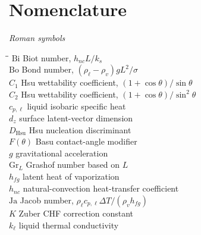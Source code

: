 \section*{Nomenclature}

\noindent\textit{Roman symbols}
\begin{tabbing}
\hspace{2.4cm}\=\hspace{10cm}\=\kill
$\mathrm{Bi}$      \> Biot number, $h_{nc}L/k_s$                          \> [---] \\
$\mathrm{Bo}$      \> Bond number, $(\rho_{\ell}-\rho_v)gL^2/\sigma$        \> [---] \\
$C_1$              \> Hsu wettability coefficient, $(1+\cos\theta)/\sin\theta$  \> [---] \\
$C_2$              \> Hsu wettability coefficient, $(1+\cos\theta)/\sin^{2}\theta$ \> [---] \\
$c_{p,\ell}$       \> liquid isobaric specific heat                       \> [\si{J/(kg.K)}] \\
$d_z$              \> surface latent-vector dimension                     \> [---] \\
$D_{\mathrm{Hsu}}$ \> Hsu nucleation discriminant                         \> [---] \\
$F(\theta)$        \> Basu contact-angle modifier                         \> [---] \\
$g$                \> gravitational acceleration                          \> [\si{m/s^2}] \\
$\mathrm{Gr}_L$    \> Grashof number based on $L$                         \> [---] \\
$h_{fg}$           \> latent heat of vaporization                         \> [\si{J/kg}] \\
$h_{nc}$           \> natural-convection heat-transfer coefficient        \> [\si{W/(m^2.K)}] \\
$\mathrm{Ja}$      \> Jacob number, $\rho_{\ell}c_{p,\ell}\Delta T/(\rho_v h_{fg})$ \> [---] \\
$K$                \> Zuber CHF correction constant                       \> [---] \\
$k_{\ell}$         \> liquid thermal conductivity                         \> [\si{W/(m.K)}] \\

\end{tabbing}
